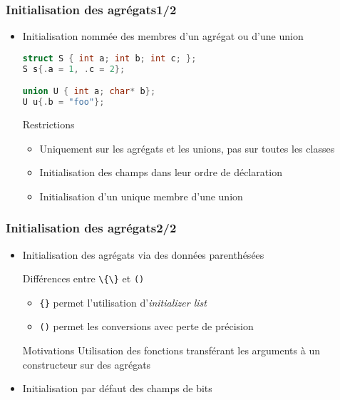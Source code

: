\documentclass[C++.tex]{subfiles}
\begin{document}
\begin{frame}[fragile]
	\frametitle{Initialisation des agrégats\titlehfill{}1/2}
	\begin{itemize}
		\item Initialisation nommée des membres d'un agrégat ou d'une union
	

		\begin{lstlisting}[language=C++]
struct S { int a; int b; int c; }; 
S s{.a = 1, .c = 2};

union U { int a; char* b};
U u{.b = "foo"}; \end{lstlisting}

		\begin{alertblock}{Restrictions}
			\begin{itemize}
				\item Uniquement sur les agrégats et les unions, pas sur toutes les classes
				\item Initialisation des champs dans leur ordre de déclaration
				\item Initialisation d'un unique membre d'une union

			\end{itemize}
		\end{alertblock}
	\end{itemize}
\end{frame}

\begin{frame}[fragile]
	\frametitle{Initialisation des agrégats\titlehfill{}2/2}
	\begin{itemize}
		\item Initialisation des agrégats via des données parenthésées

		\begin{block}{Différences entre \lstinline|\{\}| et \lstinline|()| }
			\begin{itemize}
				\item \lstinline|{}| permet l'utilisation d'\textit{initializer list}
				\item \lstinline|()| permet les conversions avec perte de précision
			\end{itemize}
		\end{block}

		\begin{block}{Motivations}
			Utilisation des fonctions transférant les arguments à un constructeur sur des agrégats
		\end{block}


		\item Initialisation par défaut des champs de bits
	\end{itemize}
\end{frame}
\end{document}
